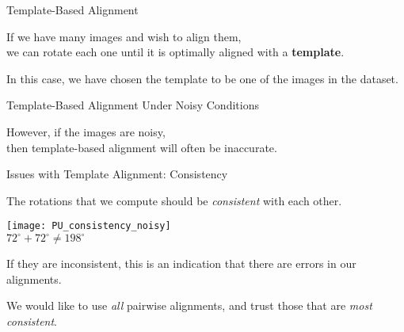\begin{frame}{Template-Based Alignment}
	\centering	
	
	If we have many images and wish to align them, \\ we can rotate each one until it is optimally aligned with a {\bf template}.

	In this case, we have chosen the template to be one of the images in the dataset.

		
\end{frame}

\begin{frame}{Template-Based Alignment Under Noisy Conditions}

	\centering
	However, if the images are noisy, 
	\\then template-based alignment will often be inaccurate.

	
\end{frame}

\begin{frame}{Issues with Template Alignment: Consistency}

	The rotations that we compute should be {\em consistent} with each other. 
	
	\centering
	\texttt{[image: PU\_consistency\_noisy]}\\
	{\scriptsize $72^{\circ} + 72 ^{\circ} \neq 198^{\circ}$}

If they are inconsistent, this is an indication that there are errors in our alignments.
	
	We would like to use {\em all} pairwise alignments, and trust those that are {\em most consistent}.
	
\end{frame}

